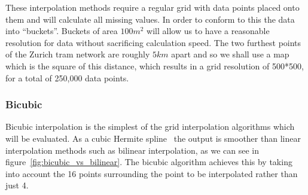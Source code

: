         These interpolation methods require a regular grid with data points placed onto them and will calculate all missing values. In order to conform to this the data into ``buckets''. Buckets of area $100m^{2}$ will allow us to have a reasonable resolution for data without sacrificing calculation speed. The two furthest points of the Zurich tram network are roughly $5km$ apart and so we shall use a map which is the square of this distance, which results in a grid resolution of 500*500, for a total of 250,000 data points. 

        \subsubsection{Bicubic}\label{background_interpolation_methods_bicubic}

            Bicubic interpolation is the simplest of the grid interpolation algorithms which will be evaluated. As a cubic Hermite spline~\cite{practicalguidesplines} the output is smoother than linear interpolation methods such as bilinear interpolation, as we can see in figure~\ref{fig:bicubic_vs_bilinear}. The bicubic algorithm achieves this by taking into account the 16 points surrounding the point to be interpolated rather than just 4. 

